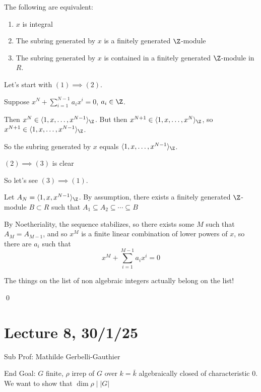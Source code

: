 \documentclass[x11names,reqno,14pt]{extarticle}
\newcommand{\bark}{\bar{k}}
\begin{document}
\prop

The following are equivalent:\,
\begin{enumerate}

\item $x$ is integral

\item The subring generated by $x$ is a finitely generated $\Z$-module

\item The subring generated by $x$ is contained in a finitely generated $\Z$-module in $R$. 

\end{enumerate}

\proof

Let's start with $(1)\implies(2)$. 

Suppose $x^N + \sum_{i=1}^{N-1}a_ix^i = 0$, $a_i \in \Z$. 

Then $x^N \in \langle1,x,\dots,x^{N-1}\rangle_\Z$. But then $x^{N+1} \in \langle 1, x, \dots, x^N\rangle_\Z$, so $x^{N+1} \in \langle 1, x, \dots, x^{N-1}\rangle_\Z$.

So the subring generated by $x$ equals $\langle 1, x, \dots, x^{N-1}\rangle_\Z$.

$(2)\implies(3)$ is clear

So let's see $(3)\implies(1)$. 

Let $A_N = \langle 1, x, x^{N-1}\rangle_\Z$. By assumption, there exists a finitely generated $\Z$-module $B \subset R$ such that $A_1\subseteq A_2 \subseteq\cdots \subseteq B$ 

By Noetheriality, the sequence stabilizes, so there exists some $M$ such that $A_M = A_{M-1}$, and so $x^M$ is a finite linear combination of lower powers of $x$, so there are $a_i$ such that
\[
x^M + \sum_{i=1}^{M-1}a_ix^i = 0
\]

\cor

The things on the list of non algebraic integers actually belong on the list!

\proof

\qed

\section*{Lecture 8, 30/1/25}

Sub Prof: Mathilde Gerbelli-Gauthier

End Goal: $G$ finite, $\rho$ irrep of $G$ over $k = \bark$ algebraically closed of characteristic 0. We want to show that $\dim \rho \mid |G|$
\end{document}
